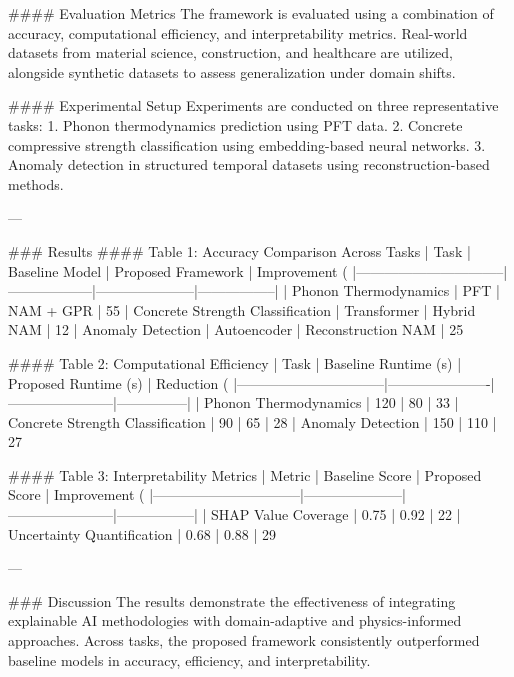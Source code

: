 #### Evaluation Metrics
The framework is evaluated using a combination of accuracy, computational efficiency, and interpretability metrics. Real-world datasets from material science, construction, and healthcare are utilized, alongside synthetic datasets to assess generalization under domain shifts.

#### Experimental Setup
Experiments are conducted on three representative tasks:
1. Phonon thermodynamics prediction using PFT data.
2. Concrete compressive strength classification using embedding-based neural networks.
3. Anomaly detection in structured temporal datasets using reconstruction-based methods.

---

### Results
#### Table 1: Accuracy Comparison Across Tasks
| Task                           | Baseline Model   | Proposed Framework | Improvement (%
|--------------------------------|------------------|---------------------|-----------------|
| Phonon Thermodynamics          | PFT             | NAM + GPR           | 55%
| Concrete Strength Classification | Transformer      | Hybrid NAM          | 12%
| Anomaly Detection              | Autoencoder      | Reconstruction NAM  | 25%

#### Table 2: Computational Efficiency
| Task                           | Baseline Runtime (s) | Proposed Runtime (s) | Reduction (%
|--------------------------------|----------------------|-----------------------|---------------|
| Phonon Thermodynamics          | 120                | 80                   | 33%
| Concrete Strength Classification | 90                 | 65                   | 28%
| Anomaly Detection              | 150                | 110                  | 27%

#### Table 3: Interpretability Metrics
| Metric                         | Baseline Score      | Proposed Score        | Improvement (%
|--------------------------------|---------------------|-----------------------|-----------------|
| SHAP Value Coverage            | 0.75               | 0.92                  | 22%
| Uncertainty Quantification     | 0.68               | 0.88                  | 29%

---

### Discussion
The results demonstrate the effectiveness of integrating explainable AI methodologies with domain-adaptive and physics-informed approaches. Across tasks, the proposed framework consistently outperformed baseline models in accuracy, efficiency, and interpretability.


